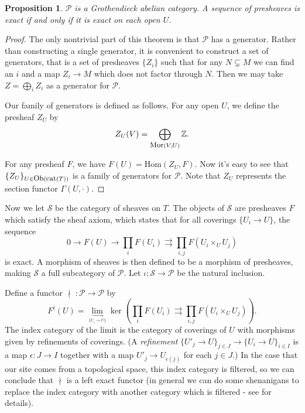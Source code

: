 \documentclass[letterpaper,11pt]{article}
\newtheorem{prop}{Proposition}
\theoremstyle{definition}
\theoremstyle{remark}
\begin{document}
\begin{prop} $\mathcal{P}$ is a Grothendieck abelian category. A sequence of presheaves is exact if and only if it is exact on each open $U$.
\end{prop}
\begin{proof} The only nontrivial part of this theorem is that $\mathcal{P}$ has a generator. Rather than constructing a single generator, it is convenient to construct a set of generators, that is a set of presheaves $\{Z_i\}$ such that for any $N\subsetneq M$ we can find an $i$ and a map $Z_i \rightarrow M$ which does not factor through $N$. Then we may take $Z = \bigoplus_i Z_i$ as a generator for $\mathcal{P}$.

Our family of generators is defined as follows. For any open $U$, we define the presheaf $Z_U$ by
\[
Z_U(V) = \bigoplus_{\mbox{\small Mor}(V,U)} \mathbb{Z}.
\]

For any presheaf $F$, we have $F(U) = \mbox{Hom}(Z_U, F)$. Now it's easy to see that $\{Z_U\}_{U\in\mbox{\small Ob}(\mbox{\small cat}(T))}$ is a family of generators for $\mathcal{P}$. Note that $Z_U$ represents the section functor $\Gamma(U,\cdot)$.
\end{proof}

Now we let $\mathcal{S}$ be the category of sheaves on $T$. The objects of $\mathcal{S}$ are presheaves $F$ which satisfy the sheaf axiom, which states that for all coverings $\{U_i\rightarrow U\}$, the sequence
\[
0 \rightarrow F(U) \rightarrow \prod_i F(U_i) \rightrightarrows \prod_{i,j} F(U_i \times_U U_j)
\]
is exact. A morphism of sheaves is then defined to be a morphism of presheaves, making $\mathcal{S}$ a full subcategory of $\mathcal{P}$. Let $\iota : \mathcal{S} \rightarrow \mathcal{P}$ be the natural inclusion.

Define a functor $\nmid \; : \mathcal{P} \rightarrow \mathcal{P}$ by
\[
F^\nmid(U) = \underset{\underset{\{U_i\rightarrow U\}}{\longrightarrow}}{\lim} \ker(\prod_i F(U_i) \rightrightarrows \prod_{i,j} F(U_i \times_U U_j)).
\]
The index category of the limit is the category of coverings of $U$ with morphisms given by refinements of coverings. (A \emph{refinement} $\{U'_j \rightarrow U\}_{j\in J} \rightarrow \{U_i\rightarrow U\}_{i\in I}$ is a map $\epsilon : J \rightarrow I$ together with a map $U'_j \rightarrow U_{\epsilon(j)}$ for each $j\in J$.) In the case that our site comes from a topological space, this index category is filtered, so we can conclude that $\nmid$ is a left exact functor (in general we can do some shenanigans to replace the index category with another category which is filtered - see \cite{etale} for details).
\end{document}
